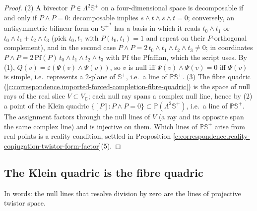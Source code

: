 \documentclass[11pt]{article}
\theoremstyle{definition}
\theoremstyle{plain}
\providecommand{\C}{}\renewcommand{\C}{\mathbb{C}}
\providecommand{\CS}{}\renewcommand{\CS}{{\mathbb{S}^{+}}}
\providecommand{\PCS}{}\renewcommand{\PCS}{\mathbb{P}{\mathbb{S}^{+}}}
\begin{document}
\begin{proof}
(2) A bivector $P \in \Lambda^2\CS$ on a four-dimensional space is decomposable if and only if $P \wedge P = 0$: decomposable implies $s\wedge t\wedge s\wedge t = 0$; conversely, an antisymmetric bilinear form on $\CS^*$ has a basis in which it reads $t_0\wedge t_1$ or $t_0\wedge t_1 + t_2\wedge t_3$ (pick $t_0, t_1$ with $P(t_0,t_1) = 1$ and repeat on their $P$-orthogonal complement), and in the second case $P\wedge P = 2\,t_0\wedge t_1\wedge t_2\wedge t_3 \neq 0$; in coordinates $P\wedge P = 2\,\mathrm{Pf}(P)\, t_0\wedge t_1\wedge t_2 \wedge t_3$ with $\mathrm{Pf}$ the Pfaffian, which the script uses. By (1), $Q(v) = \varepsilon(\Psi(v)\wedge\Psi(v))$, so $v$ is null iff $\Psi(v)\wedge\Psi(v) = 0$ iff $\Psi(v)$ is simple, i.e.\ represents a $2$-plane of $\CS$, i.e.\ a line of $\PCS$.
(3) The fibre quadric (\ref{c:correspondence.imported-forced-completion-fibre-quadric}) is the space of null rays of the real slice $V \subset V_\C$; each null ray spans a complex null line, hence by (2) a point of the Klein quadric $\{[P] : P\wedge P = 0\} \subset \mathbb{P}(\Lambda^2\CS)$, i.e.\ a line of $\PCS$. The assignment factors through the null lines of $V$ (a ray and its opposite span the same complex line) and is injective on them. Which lines of $\PCS$ arise from real points is a reality condition, settled in Proposition \ref{c:correspondence.reality-conjugation-twistor-form-factor}(5).

\end{proof}

\subsection*{The Klein quadric is the fibre quadric}
\label{c:note.correspondence.setting-klein-quadric-fibre-quadric}
In words: the null lines that resolve division by zero are the lines of projective twistor space.
\end{document}

